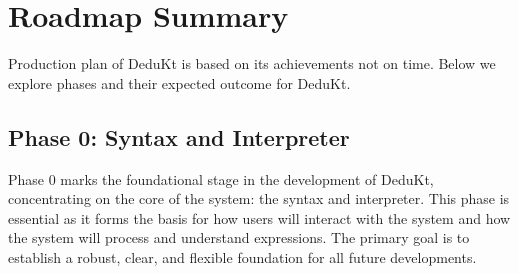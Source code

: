 \section{Roadmap Summary}\label{sec:roadmap-summary}
Production plan of DeduKt is based on its achievements not on time.
Below we explore phases and their expected outcome for DeduKt.

\subsection{Phase 0: Syntax and Interpreter}\label{subsec:phase-0:-syntax-and-interpreter}
Phase 0 marks the foundational stage in the development of DeduKt, concentrating on the core of the system: the syntax and interpreter.
This phase is essential as it forms the basis for how users will interact with the system and how the system will process and understand expressions.
The primary goal is to establish a robust, clear, and flexible foundation for all future developments.

